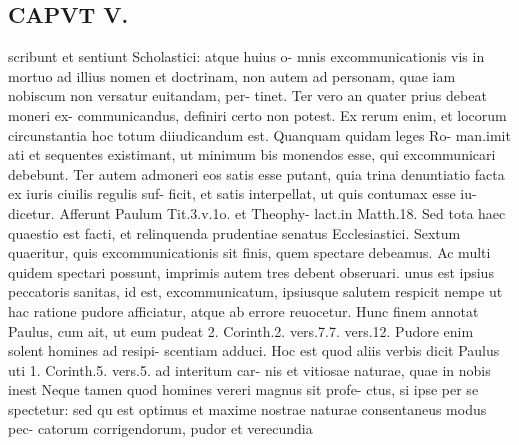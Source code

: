 \documentclass{article}
\begin{document}
\begin{pages}
\section*{CAPVT  V. }
\marginpar{[ p.399 ]}scribunt et sentiunt Scholastici: atque huius o- mnis excommunicationis vis in mortuo ad illius nomen et doctrinam, non autem ad personam, quae iam nobiscum non versatur euitandam, per- tinet. Ter vero an quater prius debeat moneri ex- communicandus, definiri certo non potest. Ex rerum enim, et locorum circunstantia hoc totum diiudicandum est. Quanquam quidam leges Ro- man.imit ati et sequentes existimant, ut minimum bis monendos esse, qui excommunicari debebunt. Ter autem admoneri eos satis esse putant, quia trina denuntiatio facta ex iuris ciuilis regulis suf- ficit, et satis interpellat, ut quis contumax esse iu- dicetur. Afferunt Paulum Tit.3.v.1o. et Theophy- lact.in Matth.18. Sed tota haec quaestio est facti, et relinquenda prudentiae senatus Ecclesiastici. Sextum quaeritur, quis excommunicationis sit finis, quem spectare debeamus. Ac multi quidem spectari possunt, imprimis autem tres debent obseruari. unus est ipsius peccatoris sanitas, id est, excommunicatum, ipsiusque salutem respicit nempe ut hac ratione pudore afficiatur, atque ab errore reuocetur. Hunc finem annotat Paulus, cum ait, ut eum pudeat 2. Corinth.2. vers.7.7. vers.12. Pudore enim solent homines ad resipi- scentiam adduci. Hoc est quod aliis verbis dicit Paulus uti 1. Corinth.5. vers.5. ad interitum car- nis et vitiosae naturae, quae in nobis inest Neque tamen quod homines vereri magnus sit profe- ctus, si ipse per se spectetur: sed qu est optimus et maxime nostrae naturae consentaneus modus pec- catorum corrigendorum, pudor et verecundia 

\end{pages}
\end{document}

